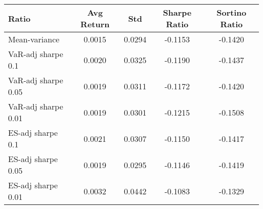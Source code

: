 \begin{tabular}{lcccc}
\toprule
Ratio & Avg Return & Std & Sharpe Ratio & Sortino Ratio\\
\midrule
Mean-variance & 0.0015 & 0.0294 & -0.1153 & -0.1420\\
VaR-adj sharpe 0.1 & 0.0020 & 0.0325 & -0.1190 & -0.1437\\
VaR-adj sharpe 0.05 & 0.0019 & 0.0311 & -0.1172 & -0.1420\\
VaR-adj sharpe 0.01 & 0.0019 & 0.0301 & -0.1215 & -0.1508\\
ES-adj sharpe 0.1 & 0.0021 & 0.0307 & -0.1150 & -0.1417\\
ES-adj sharpe 0.05 & 0.0019 & 0.0295 & -0.1146 & -0.1419\\
ES-adj sharpe 0.01 & 0.0032 & 0.0442 & -0.1083 & -0.1329\\
\bottomrule
\end{tabular}
